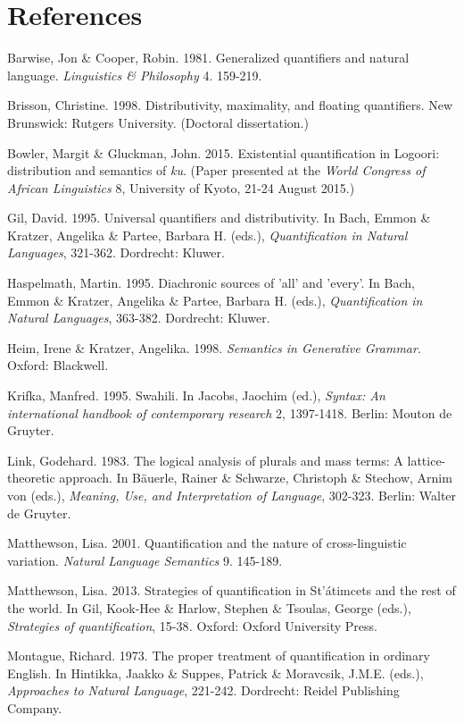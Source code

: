 \documentclass[output=paper]{langsci/langscibook}
\begin{document}
\chapter{References}

Barwise, Jon \& Cooper, Robin. 1981. Generalized quantifiers and natural language. \textit{Linguistics \& Philosophy }4. 159-219.

Brisson, Christine. 1998. Distributivity, maximality, and floating quantifiers. New Brunswick: Rutgers University. (Doctoral dissertation.)

Bowler, Margit \& Gluckman, John. 2015. Existential quantification in Logoori: distribution and semantics of \textit{ku}. (Paper presented at the \textit{World Congress of African Linguistics }8, University of Kyoto, 21-24 August 2015.)

Gil, David. 1995. Universal quantifiers and distributivity. In Bach, Emmon \& Kratzer, Angelika \& Partee, Barbara H. (eds.), \textit{Quantification in Natural Languages}, 321-362. Dordrecht: Kluwer.

Haspelmath, Martin. 1995. Diachronic sources of 'all' and 'every'. In Bach, Emmon \& Kratzer, Angelika \& Partee, Barbara H. (eds.), \textit{Quantification in Natural Languages}, 363-382. Dordrecht: Kluwer.

Heim, Irene \& Kratzer, Angelika. 1998. \textit{Semantics in Generative Grammar}. Oxford: Blackwell.

Krifka, Manfred. 1995. Swahili. In Jacobs, Jaochim (ed.), \textit{Syntax: An international handbook of contemporary research }2, 1397-1418. Berlin: Mouton de Gruyter.

Link, Godehard. 1983. The logical analysis of plurals and mass terms: A lattice-theoretic approach. In Bäuerle, Rainer \& Schwarze, Christoph \& Stechow, Arnim von (eds.), \textit{Meaning, Use, and Interpretation of Language}, 302-323. Berlin: Walter de Gruyter.

Matthewson, Lisa. 2001. Quantification and the nature of cross-linguistic variation. \textit{Natural Language Semantics }9. 145-189.

Matthewson, Lisa. 2013. Strategies of quantification in St'átimcets and the rest of the world. In Gil, Kook-Hee \& Harlow, Stephen \& Tsoulas, George (eds.), \textit{Strategies of quantification}, 15-38\textit{. }Oxford: Oxford University Press.

Montague, Richard. 1973. The proper treatment of quantification in ordinary English. In Hintikka, Jaakko \& Suppes, Patrick \& Moravcsik, J.M.E. (eds.), \textit{Approaches to Natural Language}, 221-242. Dordrecht: Reidel Publishing Company.
\end{document}
